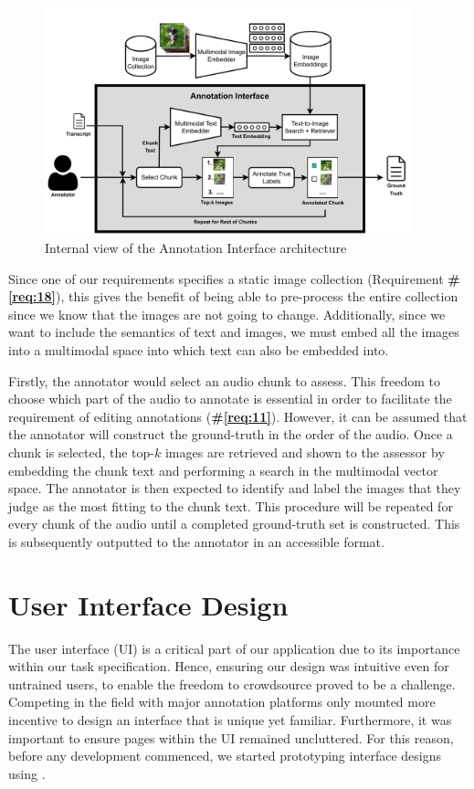 \documentclass{l4proj}
\begin{document}
\begin{figure}[h]
    \centering
    \includegraphics[width=0.95\textwidth]{figures/annotation_interface.pdf}
    \caption{Internal view of the Annotation Interface architecture}
    \label{fig:annotation_interface}
\end{figure}

Since one of our requirements specifies a static image collection (Requirement \textbf{\#\ref{req:18}}), this gives the benefit of being able to pre-process the entire collection since we know that the images are not going to change. Additionally, since we want to include the semantics of text and images, we must embed all the images into a multimodal space into which text can also be embedded into.

Firstly, the annotator would select an audio chunk to assess. This freedom to choose which part of the audio to annotate is essential in order to facilitate the requirement of editing annotations (\textbf{\#\ref{req:11}}). However, it can be assumed that the annotator will construct the ground-truth in the order of the audio. Once a chunk is selected, the top-$k$ images are retrieved and shown to the assessor by embedding the chunk text and performing a search in the multimodal vector space. The annotator is then expected to identify and label the images that they judge as the most fitting to the chunk text. This procedure will be repeated for every chunk of the audio until a completed ground-truth set is constructed. This is subsequently outputted to the annotator in an accessible format.


\section{User Interface Design}
The user interface (UI) is a critical part of our application due to its importance within our task specification. Hence, ensuring our design was intuitive even for untrained users, to enable the freedom to crowdsource proved to be a challenge. Competing in the field with major annotation platforms only mounted more incentive to design an interface that is unique yet familiar. Furthermore, it was important to ensure pages within the UI remained uncluttered. For this reason, before any development commenced, we started prototyping interface designs using \cite{figma}.
\end{document}
